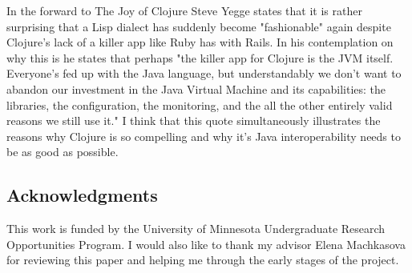 \documentclass[12pt]{article}
\begin{document}
	In the forward to The Joy of Clojure\cite{joy} Steve Yegge states that it is rather surprising that a Lisp dialect has suddenly become "fashionable" again despite Clojure's lack of a killer app like Ruby has with Rails. In his contemplation on why this is he states that perhaps "the killer app for Clojure is the JVM itself. Everyone's fed up with the Java language, but understandably we don't want to abandon our investment in the Java Virtual Machine and its capabilities: the libraries, the configuration, the monitoring, and the all the other entirely valid reasons we still use it." I think that this quote simultaneously illustrates the reasons why Clojure is so compelling and why it's Java interoperability needs to be as good as possible.

	\subsection{Acknowledgments}
	This work is funded by the University of Minnesota Undergraduate Research Opportunities Program. I would also like to thank my advisor Elena Machkasova for reviewing this paper and helping me through the early stages of the project.


%
%

%  
%
%




\end{document}
